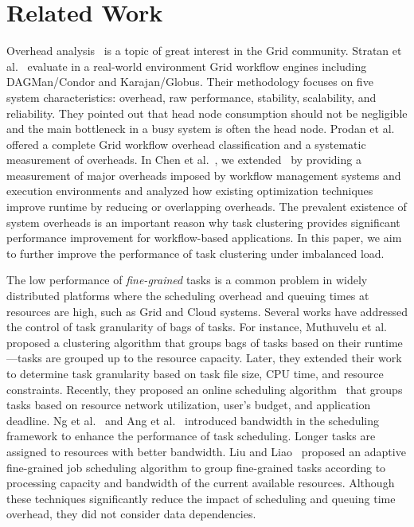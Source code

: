 \section{Related Work}

Overhead analysis~\cite{Ostberg2011, Prodan2008} is a topic of great interest in the Grid community. Stratan et al.~\cite{Stratan2008} evaluate in a real-world environment Grid workflow engines including DAGMan/Condor and Karajan/Globus. Their methodology focuses on five system characteristics: overhead, raw performance, stability, scalability, and reliability. They pointed out that head node consumption should not be negligible and the main bottleneck in a busy system is often the head node. Prodan et al.~\cite{Prodan2008} offered a complete Grid workflow overhead classification and a systematic measurement of overheads. In Chen et al.~\cite{Chen2011}, we extended~\cite{Prodan2008} by providing a measurement of major overheads imposed by workflow management systems and execution environments and analyzed how existing optimization techniques improve runtime by reducing or overlapping overheads. The prevalent existence of system overheads is an important reason why task clustering provides significant performance improvement for workflow-based applications. In this paper, we aim to further improve the performance of task clustering under imbalanced load. 

The low performance of \emph{fine-grained} tasks is a common problem in widely distributed platforms where the scheduling overhead and queuing times at resources are high, such as Grid and Cloud systems. Several works have addressed the control of task granularity of bags of tasks. For instance, Muthuvelu et al.~\cite{Muthuvelu2005} proposed a clustering algorithm that groups bags of tasks based on their runtime---tasks are grouped up to the resource capacity. Later, they extended their work~\cite{4493929} to determine task granularity based on task file size, CPU time, and resource constraints. Recently, they proposed an online scheduling algorithm~\cite{Muthuvelu2010,Muthuvelu2013} that groups tasks based on resource network utilization, user's budget, and application deadline. Ng et al.~\cite{Keat2006} and Ang et al.~\cite{Ang2009} introduced bandwidth in the scheduling framework to enhance the performance of task scheduling. Longer tasks are assigned to resources with better bandwidth. Liu and Liao~\cite{Liu2009} proposed an adaptive fine-grained job scheduling algorithm to group fine-grained tasks according to processing capacity and bandwidth of the current available resources. Although these techniques significantly reduce the impact of scheduling and queuing time overhead, they did not consider data dependencies.

